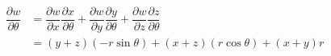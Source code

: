 \begin{align*}
	\dfrac{\partial w}{\partial \theta}
	&= \dfrac{\partial w}{\partial x}\dfrac{\partial x}{\partial \theta}
		 + \dfrac{\partial w}{\partial y}\dfrac{\partial y}{\partial \theta}
		 + \dfrac{\partial w}{\partial z}\dfrac{\partial z}{\partial \theta}\\
	&= \left(y+z\right)\left(-r\sin\theta\right)+\left(x+z\right)\left(r\cos\theta\right)+\left(x+y\right)r
\end{align*}


